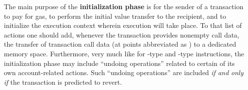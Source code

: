 The main purpose of the \textbf{initialization phase} is for the sender of a transaction
to pay for gas,
to perform the initial value transfer to the recipient,
and to initialize the execution context wherein \evm{} execution will take place.
To that list of actions one should add, whenever the transaction provides nonempty call data,
the transfer of transaction call data (at points abbreviated as ) to a dedicated memory space.
Furthermore, very much like for -type and -type instructions,
the initialization phase may include ``undoing operations'' related to certain of its own account-related actions.
Such ``undoing operations'' are included \emph{if and only if} the transaction is predicted to revert.

